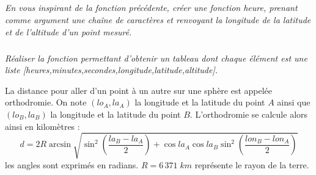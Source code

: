 \documentclass[10pt,oneside]{article}
\begin{document}
\subparagraph{}
\textit{En vous inspirant de la fonction précédente, créer une fonction heure, prenant comme argument une chaîne de caractères et renvoyant la longitude de la latitude et de l'altitude d'un point mesuré.}


\subparagraph{}
\textit{Réaliser la fonction permettant d'obtenir un tableau dont chaque élément est une liste \textsf{[heures,minutes,secondes,longitude,latitude,altitude]}.}

La distance pour aller d'un point à un autre sur une sphère est appelée orthodromie. On note $(lo_A,la_A)$ la longitude et la latitude du point $A$ ainsi que $(lo_B,la_B)$ la longitude et la latitude du point $B$. L'orthodromie se calcule alors ainsi en kilomètres : 
$$
d = 2R\arcsin \sqrt{\sin^2\left( \dfrac{la_B-la_A}{2}\right) + \cos la_A \cos la_B \sin^2\left( \dfrac{lon_B-lon_A}{2}\right)}
$$
les angles sont exprimés en radians. $R=6\,371\; km$ représente le rayon de la terre. 
\end{document}
